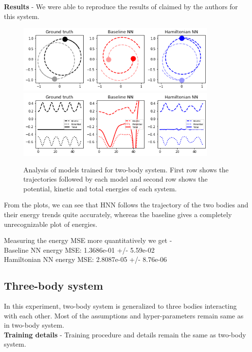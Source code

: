\textbf{Results} - We were able to reproduce the results of claimed by the authors for this system.
\begin{figure}[htp]
    \centering
    \includegraphics[width=10cm]{../openreview/2_trajectory.png}
    \includegraphics[width=10cm]{../openreview/2_energy.png}
    \caption{Analysis of models trained for two-body system. First row shows the trajectories followed by each model and second row shows the potential, kinetic and total energies of each system.}
    \label{fig:galaxy}
\end{figure}

From the plots, we can see that HNN follows the trajectory of the two bodies and their energy trends quite accurately, whereas the baseline gives a completely unrecognizable plot of energies.

Measuring the energy MSE more quantitatively we get -\\
Baseline NN energy MSE: 1.3686e-01 +/- 5.59e-02\\
Hamiltonian NN energy MSE: 2.8087e-05 +/- 8.76e-06

\subsection{Three-body system}
In this experiment, two-body system is generalized to three bodies interacting with each other.
Most of the assumptions and hyper-parameters remain same as in two-body system.\\
\textbf{Training details} - Training procedure and details remain the same as two-body system.

